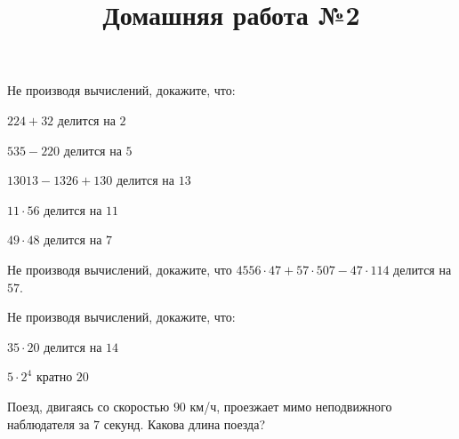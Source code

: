\begin{listofex}
	\item Не производя вычислений, докажите, что:
	\begin{enumcols}[itemcolumns=2]
		\item \( 224+32 \) делится на \( 2 \)
		\item \( 535-220 \) делится на \( 5 \)
		\item \( 13013-1326+130 \) делится на \( 13 \)
		\item \( 11\cdot56 \) делится на \( 11 \)
		\item \( 49\cdot48 \) делится на \( 7 \)
	\end{enumcols}
	\item Не производя вычислений, докажите, что \( 4556\cdot47+57\cdot507-47\cdot114 \) делится на \( 57 \).
	\item Не производя вычислений, докажите, что:
	\begin{enumcols}[itemcolumns=2]
		\item \( 35\cdot20 \) делится на \( 14 \)
		\item \( 5\cdot2^4 \) кратно \( 20 \)
	\end{enumcols}
	\item Поезд, двигаясь со скоростью \( 90 \) км/ч, проезжает мимо неподвижного наблюдателя за \( 7 \) секунд. Какова длина поезда?
\end{listofex}
\newpage
\title{Домашняя работа №2}

